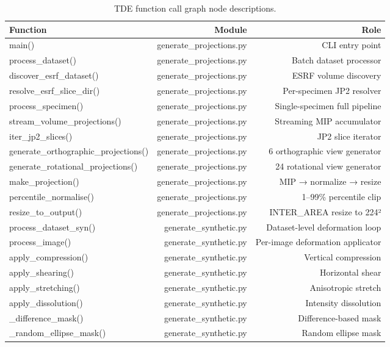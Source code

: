 \begin{table}[htbp]
\caption{TDE function call graph node descriptions.}
\label{tab:function_graph}
\begin{tabular}{lrr}
\toprule
Function & Module & Role \\
\midrule
main() & generate\_projections.py & CLI entry point \\
process\_dataset() & generate\_projections.py & Batch dataset processor \\
discover\_esrf\_dataset() & generate\_projections.py & ESRF volume discovery \\
resolve\_esrf\_slice\_dir() & generate\_projections.py & Per-specimen JP2 resolver \\
process\_specimen() & generate\_projections.py & Single-specimen full pipeline \\
stream\_volume\_projections() & generate\_projections.py & Streaming MIP accumulator \\
iter\_jp2\_slices() & generate\_projections.py & JP2 slice iterator \\
generate\_orthographic\_projections() & generate\_projections.py & 6 orthographic view generator \\
generate\_rotational\_projections() & generate\_projections.py & 24 rotational view generator \\
make\_projection() & generate\_projections.py & MIP → normalize → resize \\
percentile\_normalise() & generate\_projections.py & 1–99\% percentile clip \\
resize\_to\_output() & generate\_projections.py & INTER\_AREA resize to 224² \\
process\_dataset\_syn() & generate\_synthetic.py & Dataset-level deformation loop \\
process\_image() & generate\_synthetic.py & Per-image deformation applicator \\
apply\_compression() & generate\_synthetic.py & Vertical compression \\
apply\_shearing() & generate\_synthetic.py & Horizontal shear \\
apply\_stretching() & generate\_synthetic.py & Anisotropic stretch \\
apply\_dissolution() & generate\_synthetic.py & Intensity dissolution \\
\_difference\_mask() & generate\_synthetic.py & Difference-based mask \\
\_random\_ellipse\_mask() & generate\_synthetic.py & Random ellipse mask \\
\bottomrule
\end{tabular}
\end{table}
